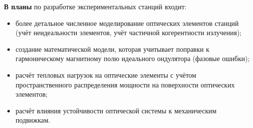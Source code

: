 \textbf{В планы} по разработке экспериментальных станций входит: %

\begin{itemize}
	\item более детальное численное моделирование оптических элементов станций (учёт неидеальности элементов, учёт частичной когерентности излучения);
	\item создание математической модели, которая учитывает поправки к гармоническому магнитному полю идеального ондулятора (фазовые ошибки);
	\item расчёт тепловых нагрузок на оптические элементы с учётом пространственного распределения мощности на поверхности оптических элементов;
	\item расчёт влияния устойчивости оптической системы к механическим подвижкам.
\end{itemize}